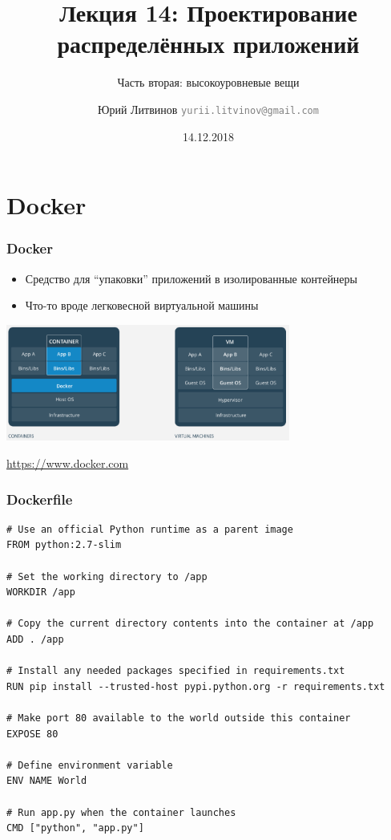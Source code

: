 \documentclass[xetex,mathserif,serif]{beamer}
\title{Лекция 14: Проектирование распределённых приложений}
\subtitle{Часть вторая: высокоуровневые вещи}
\author[Юрий Литвинов]{Юрий Литвинов \newline \textcolor{gray}{\small\texttt{yurii.litvinov@gmail.com}}}
\date{14.12.2018}
\newcommand{\attribution}[1] {
	\begin{flushright}\begin{scriptsize}\textcolor{gray}{\textcopyright\; #1}\end{scriptsize}\end{flushright}
}
\begin{document}
	
	\frame{\titlepage}

	\section{Docker}

	\begin{frame}
		\frametitle{Docker}
		\begin{itemize}
			\item Средство для ``упаковки'' приложений в изолированные контейнеры
			\item Что-то вроде легковесной виртуальной машины
		\end{itemize}
		\begin{center}
			\includegraphics[width=0.7\textwidth]{docker.png}
			\attribution{\url{https://www.docker.com}}
		\end{center}
	\end{frame}
	
	\begin{frame}[fragile]
		\frametitle{Dockerfile}
		\begin{scriptsize}
			\begin{verbatim}
# Use an official Python runtime as a parent image
FROM python:2.7-slim

# Set the working directory to /app
WORKDIR /app

# Copy the current directory contents into the container at /app
ADD . /app

# Install any needed packages specified in requirements.txt
RUN pip install --trusted-host pypi.python.org -r requirements.txt

# Make port 80 available to the world outside this container
EXPOSE 80

# Define environment variable
ENV NAME World

# Run app.py when the container launches
CMD ["python", "app.py"]
			\end{verbatim}
		\end{scriptsize}
	\end{frame}
\end{document}
